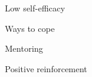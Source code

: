 \documentclass[aspectratio=169]{beamer}
\begin{document}
\begin{frame}
  \begin{center}
    \Huge Low self-efficacy
    \\ \small \cite{feedback}
  \end{center}
\end{frame}

\begin{frame}
  \begin{center}
    \Huge Ways to cope
  \end{center}
\end{frame}

\begin{frame}
  \begin{center}
    \Huge Mentoring
    \\ \small \cite{hh15}
  \end{center}
\end{frame}

\begin{frame}
  \begin{center}
    \Huge Positive reinforcement
    \\ \small \cite{hh15}
  \end{center}
\end{frame}
\end{document}
